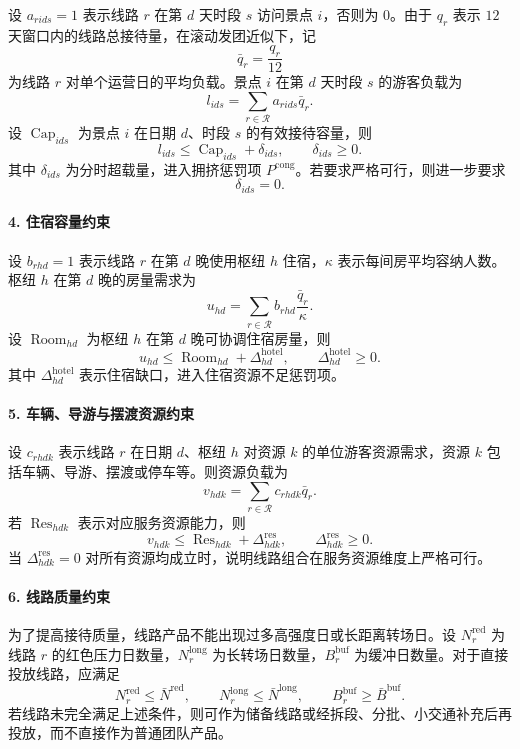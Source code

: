 \documentclass[UTF8,zihao=-4,a4paper]{ctexart}
\begin{document}
设 $a_{rids}=1$ 表示线路 $r$ 在第 $d$ 天时段 $s$ 访问景点 $i$，否则为 $0$。由于 $q_r$ 表示 $12$ 天窗口内的线路总接待量，在滚动发团近似下，记
\[
\bar{q}_r=\frac{q_r}{12}
\]
为线路 $r$ 对单个运营日的平均负载。景点 $i$ 在第 $d$ 天时段 $s$ 的游客负载为
\[
l_{ids}
=
\sum_{r\in\mathcal{R}}a_{rids}\bar{q}_r.
\]
设 $\operatorname{Cap}_{ids}$ 为景点 $i$ 在日期 $d$、时段 $s$ 的有效接待容量，则
\[
l_{ids}\leq \operatorname{Cap}_{ids}+\delta_{ids},
\qquad
\delta_{ids}\geq 0.
\]
其中 $\delta_{ids}$ 为分时超载量，进入拥挤惩罚项 $P^{\mathrm{cong}}$。若要求严格可行，则进一步要求
\[
\delta_{ids}=0.
\]

\paragraph{4. 住宿容量约束}

设 $b_{rhd}=1$ 表示线路 $r$ 在第 $d$ 晚使用枢纽 $h$ 住宿，$\kappa$ 表示每间房平均容纳人数。枢纽 $h$ 在第 $d$ 晚的房量需求为
\[
u_{hd}
=
\sum_{r\in\mathcal{R}}
b_{rhd}\frac{\bar{q}_r}{\kappa}.
\]
设 $\operatorname{Room}_{hd}$ 为枢纽 $h$ 在第 $d$ 晚可协调住宿房量，则
\[
u_{hd}\leq \operatorname{Room}_{hd}+\Delta_{hd}^{\mathrm{hotel}},
\qquad
\Delta_{hd}^{\mathrm{hotel}}\geq 0.
\]
其中 $\Delta_{hd}^{\mathrm{hotel}}$ 表示住宿缺口，进入住宿资源不足惩罚项。

\paragraph{5. 车辆、导游与摆渡资源约束}

设 $c_{rhdk}$ 表示线路 $r$ 在日期 $d$、枢纽 $h$ 对资源 $k$ 的单位游客资源需求，资源 $k$ 包括车辆、导游、摆渡或停车等。则资源负载为
\[
v_{hdk}
=
\sum_{r\in\mathcal{R}} c_{rhdk}\bar{q}_r.
\]
若 $\operatorname{Res}_{hdk}$ 表示对应服务资源能力，则
\[
v_{hdk}\leq \operatorname{Res}_{hdk}+\Delta_{hdk}^{\mathrm{res}},
\qquad
\Delta_{hdk}^{\mathrm{res}}\geq 0.
\]
当 $\Delta_{hdk}^{\mathrm{res}}=0$ 对所有资源均成立时，说明线路组合在服务资源维度上严格可行。

\paragraph{6. 线路质量约束}

为了提高接待质量，线路产品不能出现过多高强度日或长距离转场日。设 $N_r^{\mathrm{red}}$ 为线路 $r$ 的红色压力日数量，$N_r^{\mathrm{long}}$ 为长转场日数量，$B_r^{\mathrm{buf}}$ 为缓冲日数量。对于直接投放线路，应满足
\[
N_r^{\mathrm{red}}\leq \bar{N}^{\mathrm{red}},
\qquad
N_r^{\mathrm{long}}\leq \bar{N}^{\mathrm{long}},
\qquad
B_r^{\mathrm{buf}}\geq \bar{B}^{\mathrm{buf}}.
\]
若线路未完全满足上述条件，则可作为储备线路或经拆段、分批、小交通补充后再投放，而不直接作为普通团队产品。
\end{document}
